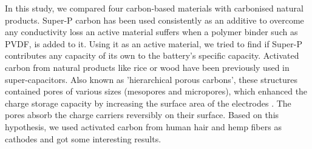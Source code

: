 In this study, we compared four carbon-based materials with carbonised natural products. Super-P carbon has been used consistently as an additive to overcome any conductivity loss an active material suffers when a polymer binder such as PVDF, is added to it. Using it as an active material, we tried to find if Super-P contributes any capacity of its own to the battery's specific capacity. Activated carbon from natural products like rice or wood have been previously used in super-capacitors\cite{hussain_development_2019, frackowiak_carbon_2001}. Also known as 'hierarchical porous carbons', these structures contained pores of various sizes (mesopores and micropores), which enhanced the charge storage capacity by increasing the surface area of the electrodes . The pores absorb the charge carriers reversibly on their surface. Based on this hypothesis, we used activated carbon from human hair and hemp fibers as cathodes and got some interesting results. 
